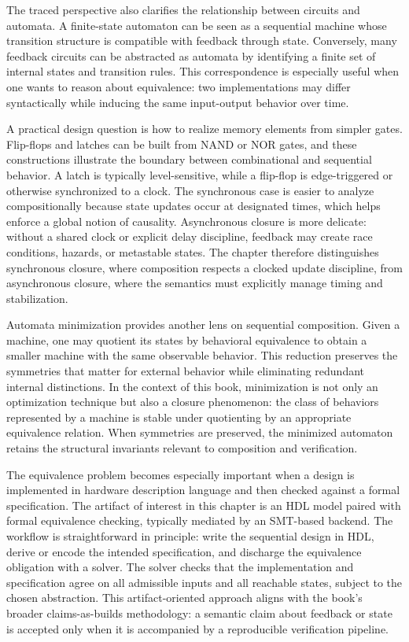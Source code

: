 \documentclass[11pt]{article}
\begin{document}
The traced perspective also clarifies the relationship between circuits and automata. A finite-state automaton can be seen as a sequential machine whose transition structure is compatible with feedback through state. Conversely, many feedback circuits can be abstracted as automata by identifying a finite set of internal states and transition rules. This correspondence is especially useful when one wants to reason about equivalence: two implementations may differ syntactically while inducing the same input-output behavior over time.

A practical design question is how to realize memory elements from simpler gates. Flip-flops and latches can be built from NAND or NOR gates, and these constructions illustrate the boundary between combinational and sequential behavior. A latch is typically level-sensitive, while a flip-flop is edge-triggered or otherwise synchronized to a clock. The synchronous case is easier to analyze compositionally because state updates occur at designated times, which helps enforce a global notion of causality. Asynchronous closure is more delicate: without a shared clock or explicit delay discipline, feedback may create race conditions, hazards, or metastable states. The chapter therefore distinguishes synchronous closure, where composition respects a clocked update discipline, from asynchronous closure, where the semantics must explicitly manage timing and stabilization.

Automata minimization provides another lens on sequential composition. Given a machine, one may quotient its states by behavioral equivalence to obtain a smaller machine with the same observable behavior. This reduction preserves the symmetries that matter for external behavior while eliminating redundant internal distinctions. In the context of this book, minimization is not only an optimization technique but also a closure phenomenon: the class of behaviors represented by a machine is stable under quotienting by an appropriate equivalence relation. When symmetries are preserved, the minimized automaton retains the structural invariants relevant to composition and verification.

The equivalence problem becomes especially important when a design is implemented in hardware description language and then checked against a formal specification. The artifact of interest in this chapter is an HDL model paired with formal equivalence checking, typically mediated by an SMT-based backend. The workflow is straightforward in principle: write the sequential design in HDL, derive or encode the intended specification, and discharge the equivalence obligation with a solver. The solver checks that the implementation and specification agree on all admissible inputs and all reachable states, subject to the chosen abstraction. This artifact-oriented approach aligns with the book's broader claims-as-builds methodology: a semantic claim about feedback or state is accepted only when it is accompanied by a reproducible verification pipeline.
\end{document}
